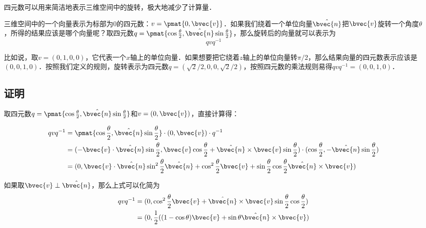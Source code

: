 
\begin{issues}
\issueAbstract
\issueTODO
\end{issues}


四元数可以用来简洁地表示三维空间中的旋转，极大地减少了计算量．

三维空间中的一个向量表示为标部为$0$的四元数：$v=\pmat{0, \bvec{v}}$．如果我们绕着一个单位向量$\hat{\bvec{n}}$把$\bvec{v}$旋转一个角度$\theta$，所得的结果应该是哪个向量呢？取四元数$q=\pmat{\cos{\frac{\theta}{2}}, \hat{\bvec{n}}\sin{\frac{\theta}{2}}}$，那么旋转后的向量就可以表示为
\begin{equation}
qvq^{-1}
\end{equation}

比如说，取$v=(0, 1, 0, 0)$，它代表一个$x$轴上的单位向量．如果想要把它绕着$z$轴上的单位向量转$\pi/2$，那么结果向量的四元数表示应该是$(0, 0, 1, 0)$．按照我们定义的规则，旋转表示为四元数$q=(\sqrt{2}/2, 0, 0, \sqrt{2}/2)$，按照四元数的乘法规则易得$qvq^{-1}=(0,0,1,0)$．

\subsection{证明}

取四元数$q=\pmat{\cos{\frac{\theta}{2}}, \hat{\bvec{n}}\sin{\frac{\theta}{2}}}$和$v=(0, \bvec{v})$，直接计算得：

\begin{equation}
\begin{aligned}
qvq^{-1}&=\pmat{\cos{\frac{\theta}{2}}, \hat{\bvec{n}}\sin{\frac{\theta}{2}}}\cdot (0, \bvec{v})\cdot q^{-1}\\&
=(-\bvec{v}\cdot\hat{\bvec{n}}\sin{\frac{\theta}{2}}, \bvec{v}\cos{\frac{\theta}{2}}+\hat{\bvec{n}}\times\bvec{v}\sin{\frac{\theta}{2}})\cdot (\cos{\frac{\theta}{2}}, -\hat{\bvec{n}}\sin{\frac{\theta}{2}})\\&
=(0, \bvec{v}\cdot\hat{\bvec{n}}\sin^2{\frac{\theta}{2}}\hat{\bvec{n}}+\cos^2{\frac{\theta}{2}}\bvec{v}+\sin{\frac{\theta}{2}}\cos{\frac{\theta}{2}}\hat{\bvec{n}}\times\bvec{v})
\end{aligned}
\end{equation}

如果取$\bvec{v}\perp\hat{\bvec{n}}$，那么上式可以化简为
\begin{equation}
\begin{aligned}
qvq^{-1}&=(0, \cos^2{\frac{\theta}{2}}\bvec{v}+\hat{\bvec{n}}\times\bvec{v}\sin{\frac{\theta}{2}}\cos{\frac{\theta}{2}})\\&
=(0, \frac{1}{2}( (1-\cos\theta)\bvec{v}+\sin\theta\hat{\bvec{n}}\times\bvec{v})
\end{aligned}
\end{equation}





